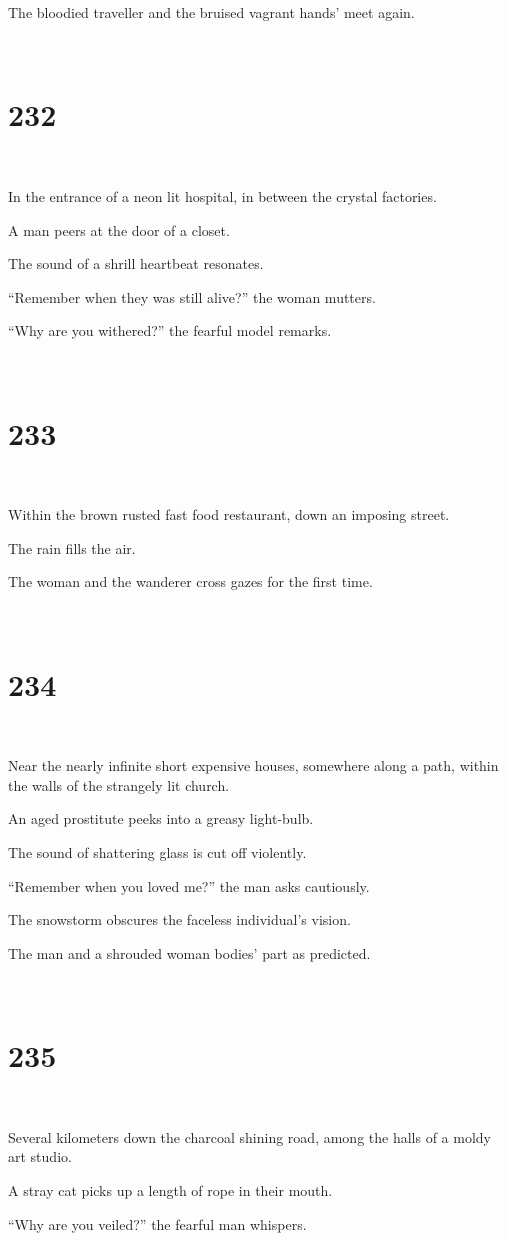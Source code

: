 \documentclass{report}
\begin{document}
The bloodied traveller and the bruised vagrant hands' meet again.

~
\chapter*{232}
~

In the entrance of a neon lit hospital, in between the crystal factories.

A man peers at the door of a closet.

The sound of a shrill heartbeat resonates.

``Remember when they was still alive?'' the woman mutters.

``Why are you withered?'' the fearful model remarks.

~
\chapter*{233}
~

Within the brown rusted fast food restaurant, down an imposing street.

The rain fills the air.

The woman and the wanderer cross gazes for the first time.

~
\chapter*{234}
~

Near the nearly infinite short expensive houses, somewhere along a path, within the walls of the strangely lit church.

An aged prostitute peeks into a greasy light-bulb.

The sound of shattering glass is cut off violently.

``Remember when you loved me?'' the man asks cautiously.

The snowstorm obscures the faceless individual's vision.

The man and a shrouded woman bodies' part as predicted.

~
\chapter*{235}
~

Several kilometers down the charcoal shining road, among the halls of a moldy art studio.

A stray cat picks up a length of rope in their mouth.

``Why are you veiled?'' the fearful man whispers.
\end{document}
